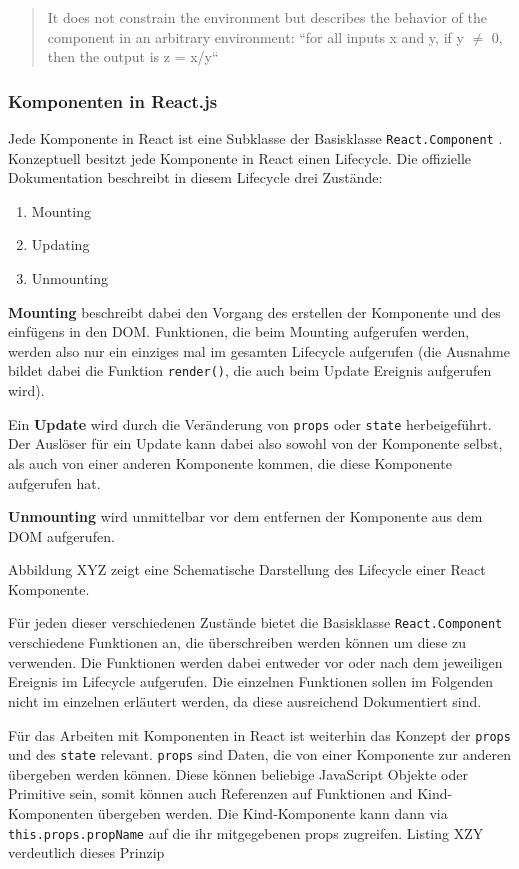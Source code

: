 \begin{quote}
  It does not constrain the environment but describes the behavior of the component in an arbitrary environment: “for all inputs x and y, if y $\neq$ 0, then the output is z = x/y“
\end{quote}

\subsubsection{Komponenten in React.js}
Jede Komponente in React ist eine Subklasse der Basisklasse \verb|React.Component| \cite{ReactCom}.
Konzeptuell besitzt jede Komponente in React einen Lifecycle. Die offizielle Dokumentation \cite{ReactCom} beschreibt in diesem Lifecycle drei Zustände:

\begin{enumerate}
  \item Mounting
  \item Updating
  \item Unmounting
\end{enumerate}

\textbf{Mounting} beschreibt dabei den Vorgang des erstellen der Komponente und des einfügens in den DOM. Funktionen, die beim Mounting aufgerufen werden, werden also nur ein einziges mal im gesamten Lifecycle aufgerufen (die Ausnahme bildet dabei die Funktion \verb|render()|, die auch beim Update Ereignis aufgerufen wird).

Ein \textbf{Update} wird durch die Veränderung von \verb|props| oder \verb|state| herbeigeführt. Der Auslöser für ein Update kann dabei also sowohl von der Komponente selbst, als auch von einer anderen Komponente kommen, die diese Komponente aufgerufen hat.

\textbf{Unmounting} wird unmittelbar vor dem entfernen der Komponente aus dem DOM aufgerufen.

Abbildung XYZ zeigt eine Schematische Darstellung des Lifecycle einer React Komponente.

Für jeden dieser verschiedenen Zustände bietet die Basisklasse \verb|React.Component| verschiedene Funktionen an, die überschreiben werden können um diese zu verwenden. Die Funktionen werden dabei entweder vor oder nach dem jeweiligen Ereignis im Lifecycle aufgerufen.
Die einzelnen Funktionen sollen im Folgenden nicht im einzelnen erläutert werden, da diese ausreichend Dokumentiert sind.

Für das Arbeiten mit Komponenten in React ist weiterhin das Konzept der \verb|props| und des \verb|state| relevant.
\verb|props| sind Daten, die von einer Komponente zur anderen übergeben werden können. Diese können beliebige JavaScript Objekte oder Primitive sein, somit können auch Referenzen auf Funktionen and Kind-Komponenten übergeben werden.  Die Kind-Komponente kann dann via \verb|this.props.propName| auf die ihr mitgegebenen props zugreifen.
Listing XZY verdeutlich dieses Prinzip

